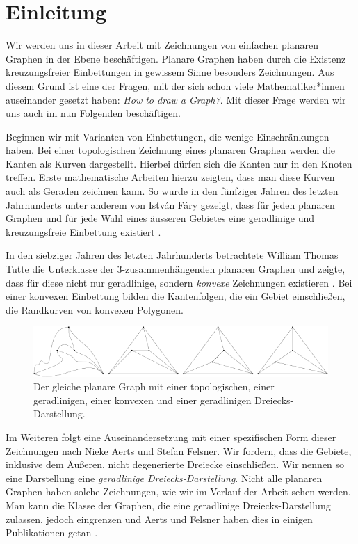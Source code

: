 \chapter{Einleitung}
Wir werden uns in dieser Arbeit mit Zeichnungen von einfachen planaren Graphen in der Ebene beschäftigen. Planare Graphen haben durch die Existenz kreuzungsfreier Einbettungen in gewissem Sinne besonders \grqq{ } Zeichnungen. Aus diesem Grund ist eine der Fragen, mit der sich schon viele Mathematiker*innen auseinander gesetzt haben: \glqq\textit{How to draw a Graph?}\grqq\cite{tutte63}. Mit dieser Frage werden wir uns auch im nun Folgenden beschäftigen. 

Beginnen wir mit Varianten von Einbettungen, die wenige Einschränkungen haben. Bei einer topologischen Zeichnung eines planaren Graphen werden die Kanten als Kurven dargestellt. Hierbei dürfen sich die Kanten nur in den Knoten treffen. Erste mathematische Arbeiten hierzu zeigten, dass man diese Kurven auch als Geraden zeichnen kann. So wurde in den fünfziger Jahren des letzten Jahrhunderts unter anderem von István Fáry gezeigt, dass für jeden planaren Graphen und für jede Wahl eines äusseren Gebietes eine geradlinige und kreuzungsfreie Einbettung existiert \cite{fary48}.

In den siebziger Jahren des letzten Jahrhunderts betrachtete William Thomas Tutte die Unterklasse der 3-zusam\-men\-hängenden planaren Graphen und zeigte, dass für diese nicht nur geradlinige, sondern \textit{konvexe} Zeichnungen existieren \cite{tutte63}. Bei einer konvexen Einbettung bilden die Kantenfolgen, die ein Gebiet einschließen, die Randkurven von konvexen Polygonen.

\begin{figure}[h]
	\centering
  \includegraphics[width=1\textwidth]{topo_straight_convex.png}
	\caption{Der gleiche planare Graph mit einer topologischen, einer ge\-rad\-lini\-gen, einer konvexen und einer geradlinigen Dreiecks-Darstellung.}
	\label{topo_straight_convex}
\end{figure}

Im Weiteren folgt eine Auseinandersetzung mit einer spezifischen Form dieser Zeichnungen nach Nieke Aerts und Stefan Felsner. Wir fordern, dass die Gebiete, inklusive dem Äußeren, nicht degenerierte Dreiecke einschließen. Wir nennen so eine Darstellung eine \textit{geradlinige Dreiecks-Darstellung}. Nicht alle planaren Graphen haben solche Zeichnungen, wie wir im Verlauf der Arbeit sehen werden. Man kann die Klasse der Graphen, die eine geradlinige Dreiecks-Darstellung zulassen, jedoch eingrenzen und Aerts und Felsner haben dies in einigen Publikationen getan \cite{af13h,af13,af15}.

